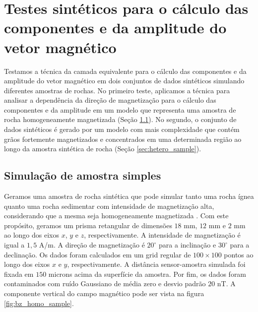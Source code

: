 \chapter{Testes sintéticos para o cálculo das componentes e da amplitude do vetor magnético}
\label{chap:synt_tests_II}

Testamos a técnica da camada equivalente para o cálculo das componentes e da amplitude do vetor magnético em dois conjuntos de dados sintéticos simulando diferentes amostras de rochas. No primeiro teste, aplicamos a técnica para analisar a dependência da direção de magnetização para o cálculo das componentes e da amplitude em um modelo que representa uma amostra de rocha homogeneamente magnetizada (Seção \ref{sec:simple_sample}). No segundo, o conjunto de dados sintéticos é gerado por um modelo com mais complexidade que contém grãos fortemente magnetizados e concentrados em uma determinada região ao longo da amostra sintética de rocha (Seção \ref{sec:hetero_sample}). 

\section{Simulação de amostra simples}
\label{sec:simple_sample}

Geramos uma amostra de rocha sintética que pode simular tanto uma rocha ígnea quanto uma rocha sedimentar com intensidade de magnetização alta, considerando que a mesma seja homogeneamente magnetizada \citep{collinson1983,dunlop1997}. Com este propósito, geramos um prisma retangular de dimensões $18$ mm, $12$ mm e $2$ mm ao longo dos eixos $x$, $y$ e $z$, respectivamente. A intensidade de magnetização é igual a $1,5$ A/m. A direção de magnetização é $20^\circ$ para a inclinação e $30^\circ$ para a declinação. Os dados foram calculados em um grid regular de $100 \times 100$ pontos ao longo dos eixos $x$ e $y$, respectivamente. A distância sensor-amostra simulada foi fixada em $150$ microns acima da superfície da amostra. Por fim, os dados foram contaminados com ruído Gaussiano de média zero e desvio padrão $20$ nT. A componente vertical do campo magnético pode ser vista na figura \ref{fig:bz_homo_sample}.       

